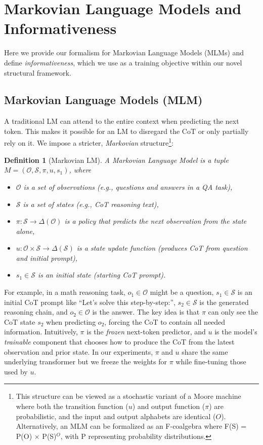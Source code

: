\documentclass{article} %
\newtheorem{definition}{Definition}[section]
\begin{document}
\section{Markovian Language Models and Informativeness}
\label{sec:MLM}

Here we provide our formalism for Markovian Language Models (MLMs) and define \emph{informativeness}, which we use as a training objective within our novel structural framework.

\subsection{Markovian Language Models (MLM)}

A traditional LM can attend to the entire context when predicting the next token. This makes it possible for an LM to disregard the CoT or only partially rely on it. We impose a stricter, \emph{Markovian} structure\footnote{This structure can be viewed as a stochastic variant of a Moore machine where both the transition function ($u$) and output function ($\pi$) are probabilistic, and the input and output alphabets are identical ($O$). Alternatively, an MLM can be formalized as an F-coalgebra where F(S) = P(O) $\times$ P(S)$^O$, with P representing probability distributions.}:
\begin{definition}[Markovian LM]
A Markovian Language Model is a tuple $M=(\mathcal{O}, \mathcal{S}, \pi, u, s_1)$, where
\begin{itemize}
\item $\mathcal{O}$ is a set of observations (e.g., questions and answers in a QA task),
\item $\mathcal{S}$ is a set of states (e.g., CoT reasoning text),
\item $\pi: \mathcal{S}\rightarrow \Delta(\mathcal{O})$ is a policy that predicts the next observation from the state alone,
\item $u: \mathcal{O}\times\mathcal{S}\rightarrow \Delta(\mathcal{S})$ is a state update function (produces CoT from question and initial prompt),
\item $s_1\in \mathcal{S}$ is an initial state (starting CoT prompt).
\end{itemize}
\end{definition}

For example, in a math reasoning task, $o_1 \in \mathcal{O}$ might be a question, $s_1 \in \mathcal{S}$ is an initial CoT prompt like ``Let's solve this step-by-step:'', $s_2 \in \mathcal{S}$ is the generated reasoning chain, and $o_2 \in \mathcal{O}$ is the answer. The key idea is that $\pi$ can only see the CoT state $s_2$ when predicting $o_2$, forcing the CoT to contain all needed information. Intuitively, $\pi$ is the \emph{frozen} next-token predictor, and $u$ is the model's \emph{trainable} component that chooses how to produce the CoT from the latest observation and prior state. In our experiments, $\pi$ and $u$ share the same underlying transformer but we freeze the weights for $\pi$ while fine-tuning those used by $u$. 
\end{document}
